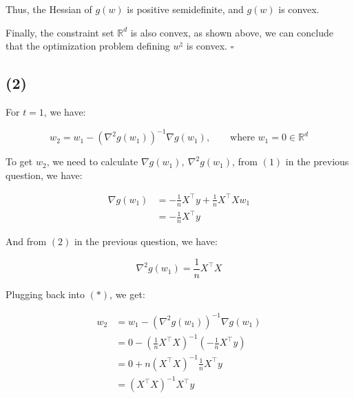 \documentclass{article}
\begin{document}
Thus, the Hessian of $g(w)$ is positive semidefinite, and $g(w)$ is convex. 
\bigskip

Finally, the constraint set $\mathbb{R}^d$ is also convex, as shown above,
we can conclude that the optimization problem defining $w^\natural$ is convex. $\square$

\subsection*{(2)}

For $t=1$, we have:

\begin{equation*}
    w_2 = w_1 - \left( \nabla^2 g ( w_1 ) \right)^{-1} \nabla g ( w_1 ), 
    \qquad \text{where } w_1 = 0 \in \mathbb{R}^d \tag{*}
\end{equation*}
\newpage

To get $w_2$, we need to calculate $\nabla g ( w_1 ), \ \nabla^2 g ( w_1 )$,
from $(1)$ in the previous question, we have:

\begin{equation*}
    \begin{split}
        \nabla g ( w_1 ) 
            &= - \frac{1}{n} X^\intercal y + \frac{1}{n} X^\intercal Xw_1 \\
            &= - \frac{1}{n} X^\intercal y
    \end{split}
\end{equation*}

And from $(2)$ in the previous question, we have:

\begin{equation*}
    \nabla^2 g ( w_1 ) = \frac{1}{n} X^\intercal X
\end{equation*}
    
Plugging back into $(*)$, we get:

\begin{equation*}
    \begin{split}
        w_2 
            &= w_1 - \left( \nabla^2 g ( w_1 ) \right)^{-1} \nabla g ( w_1 ) \\
            &= 0 - \left( \frac{1}{n} X^\intercal X \right)^{-1} \left( - \frac{1}{n} X^\intercal y \right) \\
            &= 0 + n (X^\intercal X)^{-1} \frac{1}{n} X^\intercal y \\
            &= (X^\intercal X)^{-1} X^\intercal y
    \end{split} 
\end{equation*}
\end{document}
